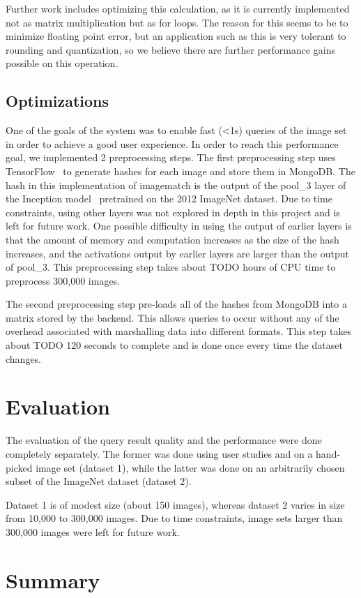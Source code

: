 Further work includes optimizing this calculation, as it is currently implemented not as matrix multiplication
but as for loops.
The reason for this seems to be to minimize floating point error, but an application such as this is very
tolerant to rounding and quantization, so we believe there are further performance gains possible on this
operation.

\subsection{Optimizations}
One of the goals of the system was to enable fast (<1s) queries of the image set in order to achieve
a good user experience.
In order to reach this performance goal, we implemented 2 preprocessing steps.
The first preprocessing step uses TensorFlow~\cite{abadi2016tensorflow} to generate hashes for each image and
store them in MongoDB.
The hash in this implementation of imagematch is the output of the pool\_3 layer of the Inception
model~\cite{szegedy2015going} pretrained on the 2012 ImageNet dataset.
Due to time constraints, using other layers was not explored in depth in this project and is left for
future work.
One possible difficulty in using the output of earlier layers is that the amount of memory and computation
increases as the size of the hash increases, and the activations output by earlier layers are larger than
the output of pool\_3.
This preprocessing step takes about TODO hours of CPU time to preprocess 300,000 images.

The second preprocessing step pre-loads all of the hashes from MongoDB into a matrix stored by the backend.
This allows queries to occur without any of the overhead associated with marshalling data into different formats.
This step takes about TODO 120 seconds to complete and is done once every time the dataset changes.

\section{Evaluation}
The evaluation of the query result quality and the performance were done completely separately.
The former was done using user studies and on a hand-picked image set (dataset 1), while the latter was done
on an arbitrarily chosen subset of the ImageNet dataset\cite{krizhevsky2012imagenet} (dataset 2).

Dataset 1 is of modest size (about 150 images), whereas dataset 2 varies in size from 10,000 to 300,000 images.
Due to time constraints, image sets larger than 300,000 images were left for future work.

\section{Summary}
